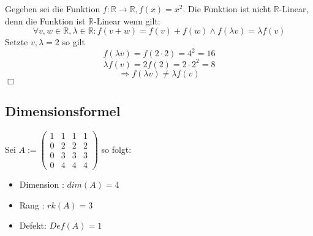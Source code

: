 \documentclass[12pt]{article}
\begin{document}

    Gegeben sei die Funktion $f:\mathbb{R} \rightarrow \mathbb{R}, f(x) = x^2$. \newline
    \newline
    Die Funktion ist nicht $\mathbb{R}$-Linear, denn \newline
    die Funktion ist $\mathbb{R}$-Linear wenn gilt:
    \[\forall v,w\in \mathbb{R}, \lambda \in \mathbb{R} : f(v+w) = f(v) + f(w) \wedge f(\lambda v) = \lambda f(v)\]
    Setzte $v,\lambda=2$ so gilt \newline
    \[f(\lambda v) = f(2\cdot2)=4^2=16\]
    \[\lambda f(v) = 2 f(2)=2\cdot 2^2=8\]
    \[\Rightarrow f(\lambda v) \neq \lambda f(v)\]
    \hfill $\Box$

    \subsection{Dimensionsformel}

    Sei $A:=\begin{pmatrix}1&1&1&1\\0&2&2&2\\0&3&3&3\\0&4&4&4\end{pmatrix}$ so folgt: \newline


    \begin{itemize}
        \item Dimension : $dim(A) = 4$
        \item Rang : $rk(A) = 3$
        \item Defekt: $Def(A) = 1$
    \end{itemize}
\end{document}
